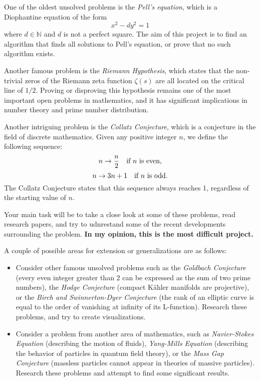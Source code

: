 \documentclass{article}
\begin{document}
    \vspace{3mm}
    One of the oldest unsolved problems is the \textit{Pell's equation}, which is a Diophantine equation of the form $$x^2 - dy^2 = 1$$ where $d \in \mathbb{N}$ and $d$ is not a perfect square. The aim of this project is to find an algorithm that finds all solutions to Pell's equation, or prove that no such algorithm exists.
    
    \vspace{3mm}
    Another famous problem is the \textit{Riemann Hypothesis}, which states that the non-trivial zeros of the Riemann zeta function $\zeta(s)$ are all located on the critical line of $1/2$. Proving or disproving this hypothesis remains one of the most important open problems in mathematics, and it has significant implications in number theory and prime number distribution. 
    
    \vspace{3mm}
    Another intriguing problem is the \textit{Collatz Conjecture}, which is a conjecture in the field of discrete mathematics. Given any positive integer $n$, we define the following sequence: $$n \rightarrow \frac{n}{2} \text{\quad if $n$ is even},$$ $$n \rightarrow 3n + 1 \text{\quad if $n$ is odd}.$$ The Collatz Conjecture states that this sequence always reaches 1, regardless of the starting value of $n$.
    
    \vspace{3mm}
    Your main task will be to take a close look at some of these problems, read research papers, and try to udnrestand some of the recent developments surrounding the problem. \textbf{In my opinion, this is the most difficult project.}
    
    \vspace{3mm}
    A couple of possible areas for extension or generalizations are as follows:
    \begin{itemize}
        \item Consider other famous unsolved problems such as the \textit{Goldbach Conjecture} (every even integer greater than 2 can be expressed as the sum of two prime numbers), the \textit{Hodge Conjecture} (compact K\"ahler manifolds are projective), or the \textit{Birch and Swinnerton-Dyer Conjecture} (the rank of an elliptic curve is equal to the order of vanishing at infinity of its L-function). Research these problems, and try to create visualizations.
        \item Consider a problem from another area of mathematics, such as \textit{Navier-Stokes Equation} (describing the motion of fluids), \textit{Yang-Mills Equation} (describing the behavior of particles in quantum field theory), or the \textit{Mass Gap Conjecture} (massless particles cannot appear in theories of massive particles). Research these problems and attempt to find some significant results.
    \end{itemize}
\end{document}
